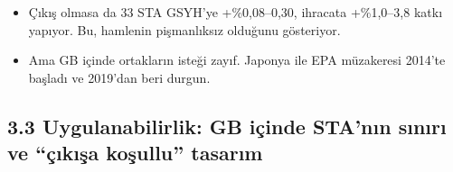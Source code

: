 \begin{enumerate}
  \begin{itemize}
  \tightlist
  \item
    Çıkış olmasa da 33 STA GSYH'ye +\%0,08--0,30, ihracata +\%1,0--3,8 katkı yapıyor. Bu, hamlenin pişmanlıksız olduğunu gösteriyor.
  \item
    Ama GB içinde ortakların isteği zayıf. Japonya ile EPA müzakeresi 2014'te başladı ve 2019'dan beri durgun.
  \end{itemize}
\end{enumerate}

\hypertarget{02c_hazirlik-33-uygulanabilirlik-gb-iuxe7inde-stanux131n-sux131nux131rux131-ve-uxe7ux131kux131ux15fa-koux15fullu-tasarux131m}{%
\subsection{3.3 Uygulanabilirlik: GB içinde STA'nın sınırı ve ``çıkışa koşullu'' tasarım}\label{02c_hazirlik-33-uygulanabilirlik-gb-iuxe7inde-stanux131n-sux131nux131rux131-ve-uxe7ux131kux131ux15fa-koux15fullu-tasarux131m}}


